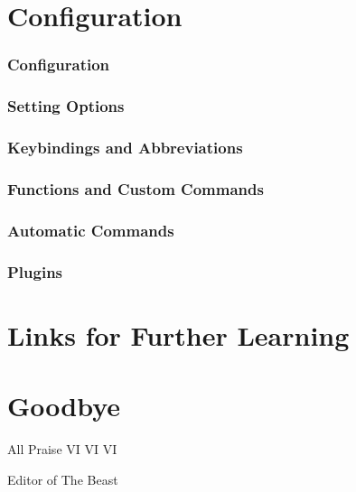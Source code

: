 \documentclass{beamer}
\begin{document}
\section{Configuration}
\begin{frame}
    \frametitle{Configuration}
    \tableofcontents[currentsection]
\end{frame}
\begin{frame}
    \frametitle{Setting Options}
\end{frame}
\begin{frame}
    \frametitle{Keybindings and Abbreviations}
\end{frame}
\begin{frame}
    \frametitle{Functions and Custom Commands}
\end{frame}
\begin{frame}
    \frametitle{Automatic Commands}
\end{frame}
\begin{frame}
    \frametitle{Plugins}
\end{frame}

\section{Links for Further Learning}
\begin{frame}
\end{frame}

\section{Goodbye}
\begin{frame}
    \centerline{\huge All Praise VI VI VI}
    \vspace{0.5cm}
    \centerline{\huge Editor of The Beast}
    \begin{figure}
	\centering
	\qquad
    \end{figure}
\end{frame}
\end{document}
